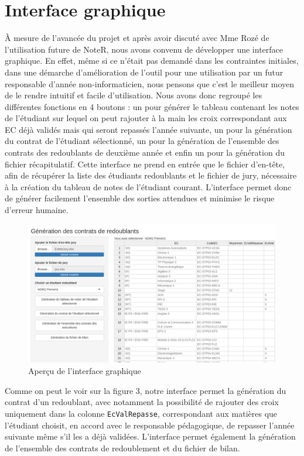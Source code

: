 \documentclass[a4paper,11pt]{article}
\begin{document}
\section{Interface graphique }	

   À mesure de l'avancée du projet et après avoir discuté avec Mme Rozé de l'utilisation future de NoteR, nous avons convenu de développer une interface graphique. En effet, même si ce n'était pas demandé dans les contraintes initiales, dans une démarche d'amélioration de l'outil pour une utilisation par un futur responsable d'année non-informaticien, nous pensons que c'est le meilleur moyen de le rendre intuitif et facile d'utilisation. Nous avons donc regroupé les différentes fonctions en 4 boutons : un pour générer le tableau contenant les notes de l'étudiant sur lequel on peut rajouter à la main les croix correspondant aux EC déjà validés mais qui seront repassés l'année suivante, un pour la génération du contrat de l'étudiant sélectionné, un pour la génération de l'ensemble des contrats des redoublants de deuxième année et enfin un pour la génération du fichier récapitulatif. Cette interface ne prend en entrée que le fichier d'en-tête, afin de récupérer la liste des étudiants redoublants et le fichier de jury, nécessaire à la création du tableau de notes de l'étudiant courant. L'interface permet donc de générer facilement l'ensemble des sorties attendues et minimise le risque d'erreur humaine.

   \begin{figure}[ht]
  \centering
  \includegraphics[width=\linewidth]{images/image_interface.jpg}
  \caption{Aperçu de l'interface graphique }
  \label{interface_graphique}
\end{figure}

Comme on peut le voir sur la figure 3, notre interface permet la génération du contrat d'un redoublant, avec notamment la possibilité de rajouter des croix uniquement dans la colonne \texttt{EcValRepasse}, correspondant aux matières que l'étudiant choisit, en accord avec le responsable pédagogique, de repasser l'année suivante même s'il les a déjà validées. L'interface permet également la génération de l'ensemble des contrats de redoublement et du fichier de bilan.
\end{document}
